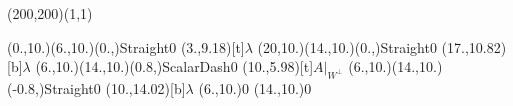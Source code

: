 \unitlength=1bp%

\begin{feynartspicture}(200,200)(1,1)

\FADiagram{}
\FAProp(0.,10.)(6.,10.)(0.,){Straight}{0}
\FALabel(3.,9.18)[t]{$\lambda$}
\FAProp(20,10.)(14.,10.)(0.,){Straight}{0}
\FALabel(17.,10.82)[b]{$\lambda$}
\FAProp(6.,10.)(14.,10.)(0.8,){ScalarDash}{0}
\FALabel(10.,5.98)[t]{$A|_{W^\perp}$}
\FAProp(6.,10.)(14.,10.)(-0.8,){Straight}{0}
\FALabel(10.,14.02)[b]{$\lambda$}
\FAVert(6.,10.){0}
\FAVert(14.,10.){0}
\end{feynartspicture}

